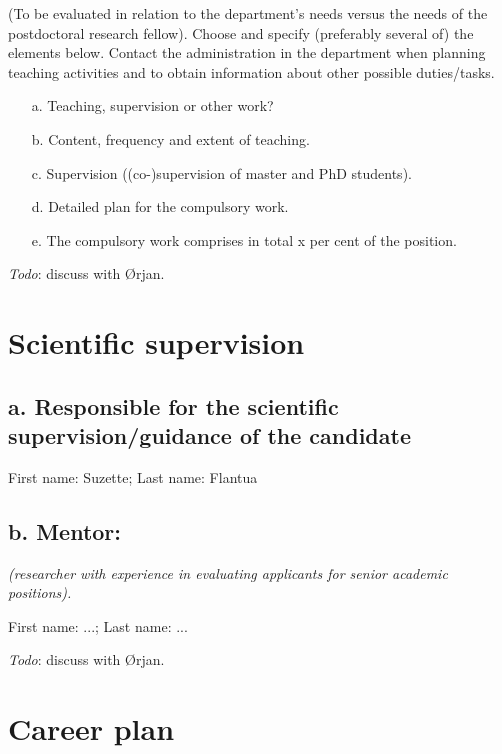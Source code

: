 \documentclass{article}
\renewcommand{\cvdoubleitem}[4]{#1: #2; #3: #4}
\newcommand{\names}[2]{\cvdoubleitem{First name}{#1}{Last name}{#2}}
\newcommand{\guideline}[1]{{\color{color2}\itshape{#1}}}
\newcommand{\todo}[1]{{\color{red}\emph{Todo}: #1}}
\begin{document}
    \guideline{
        (To be evaluated in relation to the department’s needs versus the needs
        of the postdoctoral research fellow). Choose and specify (preferably
        several of) the elements below. Contact the administration in the
        department when planning teaching activities and to obtain information
        about other possible duties/tasks.

        \begin{itemize}
          \item[a.] Teaching, supervision or other work?
          \item[b.] Content, frequency and extent of teaching.
          \item[c.] Supervision ((co-)supervision of master and PhD students).
          \item[d.] Detailed plan for the compulsory work.
          \item[e.] The compulsory work comprises in total x per cent of the position.
        \end{itemize}}

    \todo{discuss with Ørjan.}

\section{Scientific supervision}

\subsection{a. Responsible for the scientific supervision/guidance of the
            candidate}

    \names{Suzette}{Flantua}

\subsection{b. Mentor:}

    \guideline{
        (researcher with experience in evaluating applicants for senior
        academic positions).}

    \names{...}{...}

    \todo{discuss with Ørjan.}


\section{Career plan}
\end{document}
